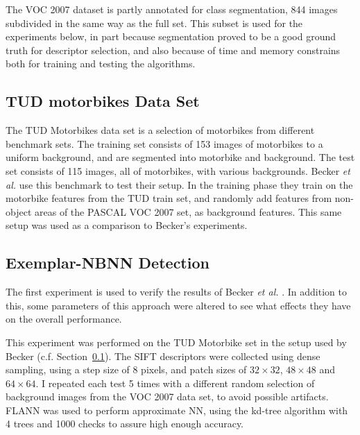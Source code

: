 The VOC 2007 dataset is partly annotated for class segmentation, 844 images subdivided in the same way as the full set. This subset is used for the experiments below, in part because segmentation proved to be a good ground truth for descriptor selection, and also because of time and memory constrains both for training and testing the algorithms.


\subsection{TUD motorbikes Data Set} %
\label{sec:tudmotorbikes_data_set}
The TUD Motorbikes data set is a selection of motorbikes from different benchmark sets. \cite{fritz2005integrating} The training set consists of 153 images of motorbikes to a uniform background, and are segmented into motorbike and background. The test set consists of 115 images, all of motorbikes, with various backgrounds. Becker \emph{et al.} \cite{becker2012codebook} use this benchmark to test their setup. In the training phase they train on the motorbike features from the TUD train set, and randomly add features from non-object areas of the PASCAL VOC 2007 set, as background features. This same setup was used as a comparison to Becker's experiments.



% 

\subsection{Exemplar-NBNN Detection} %
\label{sec:nbnn_detection}

The first experiment is used to verify the results of Becker \emph{et al.} \cite{becker2012codebook}. In addition to this, some parameters of this approach were altered to see what effects they have on the overall performance.

This experiment was performed on the TUD Motorbike set in the setup used by Becker (c.f. Section~\ref{sec:tudmotorbikes_data_set}). The SIFT descriptors were collected using dense sampling, using a step size of 8 pixels, and patch sizes of $32\times32$, $48\times48$ and $64\times64$. I repeated each test 5 times with a different random selection of background images from the VOC 2007 data set, to avoid possible artifacts. FLANN was used to perform approximate NN, using the kd-tree algorithm with 4 trees and 1000 checks to assure high enough accuracy.


